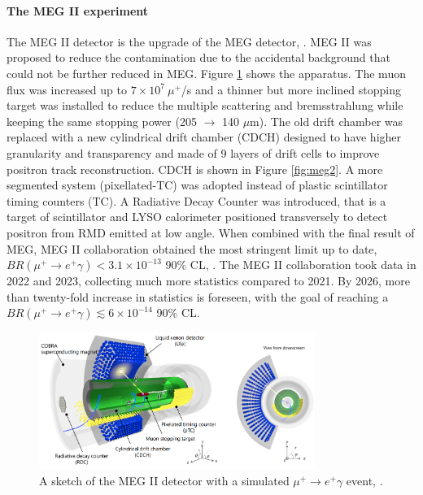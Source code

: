\paragraph{The MEG II experiment}
The MEG II detector is the upgrade of the MEG detector, \cite{megiicollaboration2024operation}.
MEG II was proposed to reduce the contamination due to the accidental background that could not be further reduced in MEG.
Figure \ref{fig:meg22} shows the apparatus. The muon flux was increased up to $7 \times 10^7 \ \mu^+$/s and a thinner but more inclined 
stopping target was installed to reduce the multiple scattering and bremsstrahlung 
while keeping the same stopping power (205 $\rightarrow$ 140 $\mu$m).
The old drift chamber was replaced with a new cylindrical drift chamber (CDCH) designed
to have higher granularity and transparency and made of 9 layers of drift cells to
improve positron track reconstruction. CDCH is shown 
in Figure \ref{fig:meg2}.
A more segmented system (pixellated-TC) was adopted instead of plastic scintillator timing counters (TC).
A Radiative Decay Counter was introduced, that is a target of scintillator and LYSO calorimeter positioned transversely to detect positron from RMD emitted at low angle.
When combined with the final result of MEG, MEG II collaboration obtained the most stringent limit up to date, $BR(\mu^+ \rightarrow e^+ \gamma)<3.1\times 10^{-13}$ 90\% CL, \cite{megiicollaboration2024search}.
The MEG II collaboration took data in 2022 and 2023, collecting much more statistics compared to 2021. By 2026, more than twenty-fold increase in statistics is foreseen, with the goal of reaching a
$BR(\mu^+ \rightarrow e^+ \gamma)\lesssim 6\times 10^{-14}$ 90\% CL.
\begin{figure}[!h]
    \centering
    \includegraphics[width =0.8\textwidth]{figures/png/Screenshot_20240307_140116.png}
    \caption[MEG II detector (I).]{A sketch of the MEG II detector with a simulated $\mu^+ \rightarrow e^+ \gamma $ event, \cite{megiicollaboration2024operation}.}
    \label{fig:meg22}
    \end{figure}

